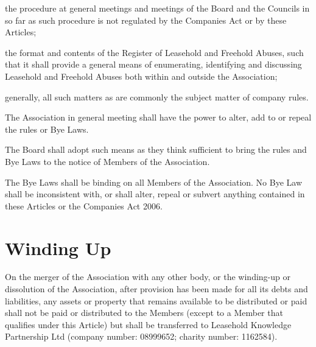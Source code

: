 \documentclass[10pt]{mk-articles-of-association}
\newcommand{\EC}[0]{Board}
\newcommand{\Exec}[0]{\EC{} }
\newcommand{\LAFA}[0]{Leasehold and Freehold Abuses}
\begin{document}
\begin{constenum}
\begin{constenum}
\item the procedure at general meetings and meetings of the \Exec and
  the Councils in so far as such procedure is not regulated by the
  Companies Act or by these Articles;

\item the format and contents of the Register of \LAFA, such that
  it shall provide a general means of enumerating, identifying and
  discussing \LAFA{} both within and outside the Association; \ITand

\item generally, all such matters as are commonly the subject matter
  of company rules.

\end{constenum}

\item The Association in general meeting shall have the power to
  alter, add to or repeal the rules or Bye Laws.

\item The \Exec shall adopt such means as they think sufficient to
  bring the rules and Bye Laws to the notice of Members of the Association.

\item The Bye Laws shall be binding on all Members of the
  Association. No Bye Law shall be inconsistent with, or shall
  alter, repeal or subvert anything contained in these Articles or
  the Companies Act 2006.
\end{constenum}


\newpage

\section{Winding Up}

On the merger of the Association with any other body, or the
  winding-up or dissolution of the Association, after provision has
  been made for all its debts and liabilities, any assets or property
  that remains available to be distributed or paid shall not be paid
  or distributed to the Members (except to a Member that qualifies
  under this Article) but shall be transferred to Leasehold Knowledge
  Partnership Ltd (company number: 08999652; charity number: 1162584).
\end{document}
